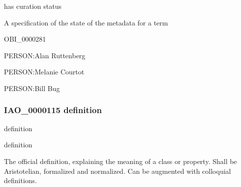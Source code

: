 \documentclass[letterpaper,10pt,english]{sphinxmanual}
\begin{document}
\begin{sphinxShadowBox}

\sphinxAtStartPar
has curation status
\end{sphinxShadowBox}

\begin{sphinxShadowBox}

\sphinxAtStartPar
A specification of the state of the metadata for a term
\end{sphinxShadowBox}

\begin{sphinxShadowBox}

\sphinxAtStartPar
OBI\_0000281
\end{sphinxShadowBox}

\begin{sphinxShadowBox}

\sphinxAtStartPar
PERSON:Alan Ruttenberg

\sphinxAtStartPar
PERSON:Melanie Courtot

\sphinxAtStartPar
PERSON:Bill Bug
\end{sphinxShadowBox}
\begin{quote}

\ignorespaces \end{quote}


\subsubsection{IAO\_0000115 \sphinxhyphen{} definition}
\label{\detokenize{doc-IAO_0000115:iao-0000115-definition}}\label{\detokenize{doc-IAO_0000115:index-0}}\label{\detokenize{doc-IAO_0000115::doc}}
\begin{sphinxShadowBox}

\sphinxAtStartPar
definition
\end{sphinxShadowBox}

\begin{sphinxShadowBox}

\sphinxAtStartPar
definition
\end{sphinxShadowBox}

\begin{sphinxShadowBox}

\sphinxAtStartPar
The official definition, explaining the meaning of a class or property. Shall be Aristotelian, formalized and normalized. Can be augmented with colloquial definitions.
\end{sphinxShadowBox}
\end{document}
